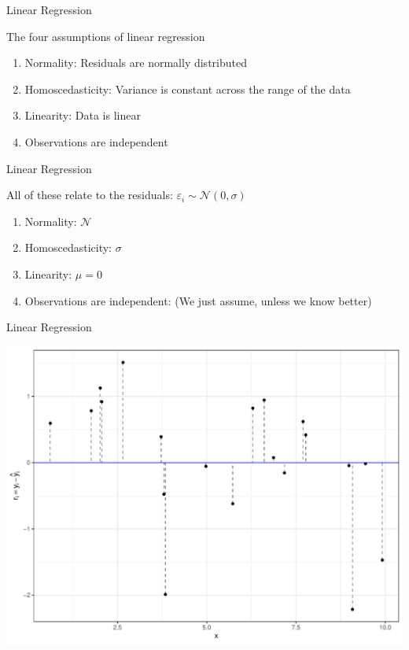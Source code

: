 \documentclass[aspectratio=169,11pt]{beamer}
\begin{document}
\begin{frame}{Linear Regression}

	The four assumptions of linear regression
	
	\begin{enumerate}
		\item Normality: Residuals are normally distributed
		\item Homoscedasticity: Variance is constant across the range of the data
		\item Linearity: Data is linear
		\item Observations are independent
	\end{enumerate}
	
\end{frame}

\begin{frame}{Linear Regression}

	All of these relate to the residuals: $\varepsilon_i \sim \mathcal{N}(0, \sigma)$
	
	\begin{enumerate}
		\item Normality: $\mathcal{N}$
		\item Homoscedasticity: $\sigma$
		\item Linearity: $\mu = 0$
		\item Observations are independent: (We just assume, unless we know better)
	\end{enumerate}
	

\end{frame}

\begin{frame}{Linear Regression}

	\begin{center}
		\includegraphics[scale=0.35]{figures/resid.pdf} 
	\end{center}
	
\end{frame}
\end{document}
